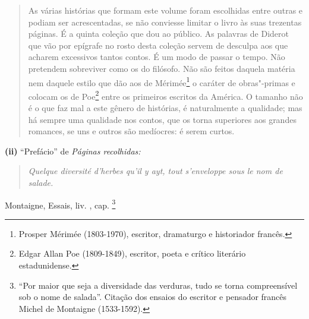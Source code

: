 \begin{quote}
As várias histórias que formam este volume foram escolhidas entre outras
e podiam ser acrescentadas, se não conviesse limitar o livro às suas
trezentas páginas. É a quinta coleção que dou ao público. As palavras de
Diderot que vão por epígrafe no rosto desta coleção servem de desculpa
aos que acharem excessivos tantos contos. É um modo de passar o tempo.
Não pretendem sobreviver como os do filósofo. Não são feitos daquela
matéria nem daquele estilo que dão aos de Mérimée\footnote{Prosper
  Mérimée (1803-1970), escritor, dramaturgo e historiador francês.} o
caráter de obras"-primas e colocam os de Poe\footnote{Edgar Allan Poe
  (1809-1849), escritor, poeta e crítico literário estadunidense.} entre
os primeiros escritos da América. O tamanho não é o que faz mal a este
gênero de histórias, é naturalmente a qualidade; mas há sempre uma
qualidade nos contos, que os torna superiores aos grandes romances, se
uns e outros são medíocres: é serem curtos.
\end{quote}

\textbf{(ii)} ``Prefácio'' de \emph{Páginas recolhidas: }

\begin{quote}
\emph{Quelque diversité d'herbes qu'il y ayt, tout s'enveloppe sous le
nom de salade. }
\end{quote}

\begin{flushright}
Montaigne, Essais, liv. , cap. \footnote{``Por maior que seja a
  diversidade das verduras, tudo se torna compreensível sob o nome de
  salada''. Citação dos ensaios do escritor e pensador francês Michel de
  Montaigne (1533-1592).}
\end{flushright}

